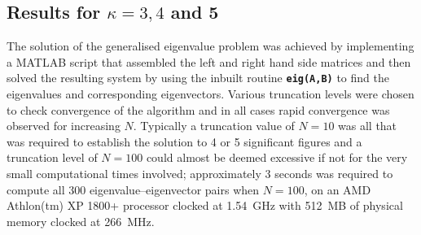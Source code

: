 \subsection[Results for $\kappa=3,4$ and 5]{Results for \boldmath$\kappa=3,4$ and 5}
\label{sec:incomlinresul}
The solution of the generalised eigenvalue problem was achieved by implementing a MATLAB script that assembled the left and right hand side matrices and then solved the resulting system by using the inbuilt routine \texttt{\textbf{eig(A,B)}} to find the eigenvalues and corresponding eigenvectors. Various truncation levels were chosen to check convergence of the algorithm and in all cases rapid convergence was observed for increasing $N$. Typically a truncation value of $N=10$ was all that was required to establish the solution to 4 or 5 significant figures and a truncation level of $N=100$ could almost be deemed excessive if not for the very small computational times involved; approximately 3 seconds was required to compute all 300 eigenvalue--eigenvector pairs when $N=100$, on an AMD Athlon(tm) XP 1800+ processor clocked at 1.54~GHz with 512~MB of physical memory clocked at 266~MHz.

